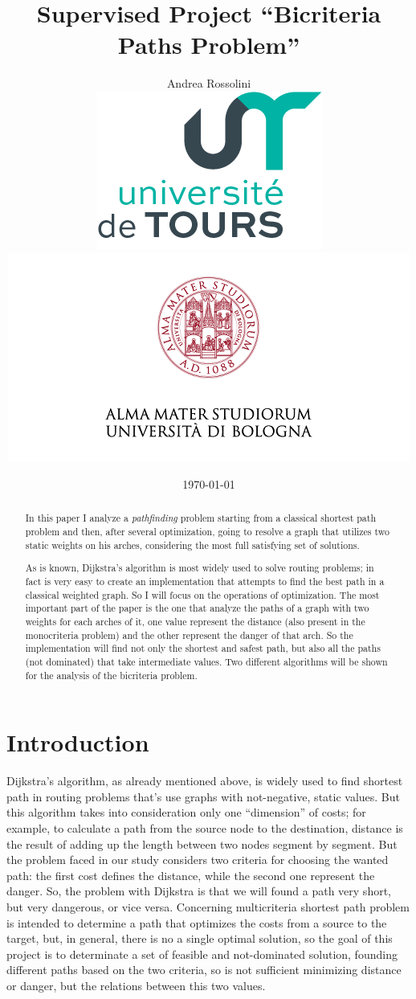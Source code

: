 \documentclass[a4paper,11pt]{report}
\title{Supervised Project ``Bicriteria Paths Problem''
\\
	}
\author{Andrea Rossolini\\
	\includegraphics[scale=0.9]{img/univToursLogo.png}
	\includegraphics[scale=0.6, trim= 0 8mm 0 0, clip]{img/uniboLogo.png}}
\date{\today}
\begin{document}
 
\maketitle

\begin{abstract}
In this paper I analyze a \textit{pathfinding} problem starting from a classical shortest path problem and then, after several optimization, going to resolve a graph that utilizes two static weights on his arches, considering the most full satisfying set of solutions.

As is known, Dijkstra's algorithm is most widely used to solve routing problems; in fact is very easy to create an implementation that attempts to find the best path in a classical weighted graph. So I will focus on the operations of optimization.
%
The most important part of the paper is the one that analyze the paths of a graph with two weights for each arches of it, one value represent the distance (also present in the monocriteria problem) and the other represent the danger of that arch. So the implementation will find not only the shortest and safest path, but also all the paths (not dominated) that take intermediate values. Two different algorithms will be shown for the analysis of the bicriteria problem.
\end{abstract}

\tableofcontents

\chapter{Introduction}
Dijkstra's algorithm, as already mentioned above, is widely used to find shortest path in routing problems that's use graphs with not-negative, static values. But this algorithm takes into consideration only one ``dimension'' of costs; for example, to calculate a path from the source node to the destination, distance is the result of adding up the length between two nodes segment by segment.
%
But the problem faced in our study considers two criteria for choosing the wanted path: the first cost defines the distance, while the second one represent the danger. So, the problem with Dijkstra is that we will found a path very short, but very dangerous, or vice versa. Concerning multicriteria shortest path problem is intended to determine a path that optimizes the costs from a source to the target, but, in general, there is no a single optimal solution, so the goal of this project is to determinate a set of feasible and not-dominated solution, founding different paths 
based on the two criteria, so is not sufficient minimizing distance or danger, but the relations between this two values.
\vspace{5mm}
\end{document}
